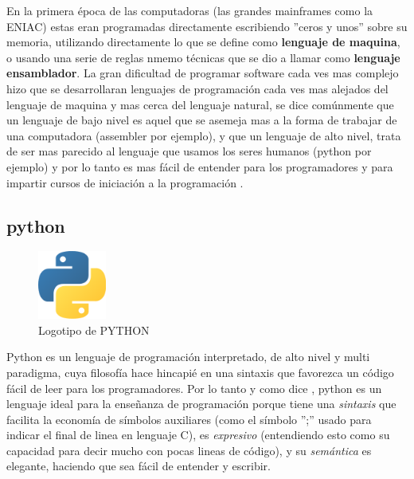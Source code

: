 En la primera época de las computadoras (las grandes mainframes como la ENIAC) estas eran programadas directamente escribiendo ''ceros y unos'' sobre su memoria, utilizando directamente lo que se define como \textbf{lenguaje de maquina}, o usando una serie de reglas nmemo técnicas que se dio a llamar como \textbf{lenguaje ensamblador}. La gran dificultad de programar software cada ves mas complejo hizo que se desarrollaran lenguajes de programación cada ves mas alejados del lenguaje de maquina y mas cerca del lenguaje natural, se dice comúnmente que un lenguaje de bajo nivel es aquel que se asemeja mas a la forma de trabajar de una computadora (assembler por ejemplo), y que un lenguaje de alto nivel, trata de ser mas parecido al lenguaje que usamos los seres humanos (python por ejemplo) y por lo tanto es mas fácil de entender para los programadores y para impartir cursos de iniciación a la programación \citep{de2016introduccion}.

\subsection{python}


\begin{figure}
  \begin{center}
    \includegraphics[width=0.2\textwidth]{figuras/Python-logo.png}
    \caption[Caption for LOF]{Logotipo de PYTHON}
    
    \label{fig:python_logo}
  \end{center}
\end{figure}

Python es un lenguaje de programación interpretado, de alto nivel y multi paradigma, cuya filosofía hace hincapié en una sintaxis que favorezca un código fácil de leer para los programadores. Por lo tanto y como dice \cite{marzal2003aprender}, python es un lenguaje ideal para la enseñanza de programación porque tiene una \textit{sintaxis} que facilita la economía de símbolos auxiliares (como el símbolo '';'' usado para indicar el final de linea en lenguaje C), es \textit{expresivo} (entendiendo esto como su capacidad para decir mucho con pocas lineas de código), y su \textit{semántica} es elegante, haciendo que sea fácil de entender y escribir.
